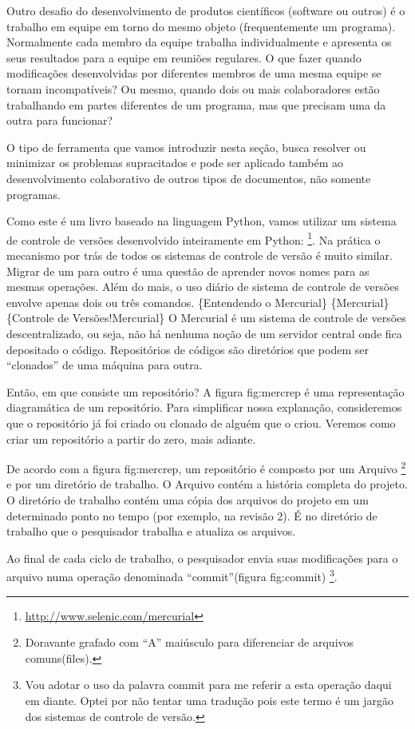 \documentclass[a4paper,10pt,brazil]{sphinxmanual}
\begin{document}
Outro desafio do desenvolvimento de produtos científicos (software
ou outros) é o trabalho em equipe em torno do mesmo objeto
(frequentemente um programa). Normalmente cada membro da equipe
trabalha individualmente e apresenta os seus resultados para a
equipe em reuniões regulares. O que fazer quando modificações
desenvolvidas por diferentes membros de uma mesma equipe se tornam
incompatíveis? Ou mesmo, quando dois ou mais colaboradores estão
trabalhando em partes diferentes de um programa, mas que precisam
uma da outra para funcionar?

O tipo de ferramenta que vamos introduzir nesta seção, busca
resolver ou minimizar os problemas supracitados e pode ser aplicado
também ao desenvolvimento colaborativo de outros tipos de
documentos, não somente programas.

Como este é um livro baseado na linguagem Python, vamos utilizar um
sistema de controle de versões desenvolvido inteiramente em Python:
 \footnote{
\href{http://www.selenic.com/mercurial}{http://www.selenic.com/mercurial}
}. Na prática o mecanismo por trás de todos os
sistemas de controle de versão é muito similar. Migrar de um para
outro é uma questão de aprender novos nomes para as mesmas
operações. Além do mais, o uso diário de sistema de controle de
versões envolve apenas dois ou três comandos.
\{Entendendo o Mercurial\} \{Mercurial\}
\{Controle de Versões!Mercurial\} O Mercurial é um sistema de
controle de versões descentralizado, ou seja, não há nenhuma noção
de um servidor central onde fica depositado o código. Repositórios
de códigos são diretórios que podem ser ``clonados'' de uma máquina
para outra.

Então, em que consiste um repositório? A figura fig:mercrep é uma
representação diagramática de um repositório. Para simplificar
nossa explanação, consideremos que o repositório já foi criado ou
clonado de alguém que o criou. Veremos como criar um repositório a
partir do zero, mais adiante.

De acordo com a figura fig:mercrep, um repositório é composto por
um Arquivo \footnote{
Doravante grafado com ``A'' maiúsculo para diferenciar de arquivos
comuns(files).
} e por um diretório de trabalho. O Arquivo contém a
história completa do projeto. O diretório de trabalho contém uma
cópia dos arquivos do projeto em um determinado ponto no tempo (por
exemplo, na revisão 2). É no diretório de trabalho que o
pesquisador trabalha e atualiza os arquivos.

Ao final de cada ciclo de trabalho, o pesquisador envia suas
modificações para o arquivo numa operação denominada
``commit''(figura fig:commit) \footnote{
Vou adotar o uso da palavra commit para me referir a esta operação
daqui em diante. Optei por não tentar uma tradução pois este termo
é um jargão dos sistemas de controle de versão.
}.
\end{document}
